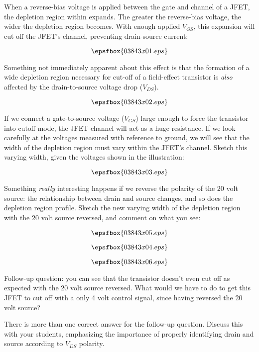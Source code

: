 

When a reverse-bias voltage is applied between the gate and channel of a JFET, the depletion region within expands.  The greater the reverse-bias voltage, the wider the depletion region becomes.  With enough applied $V_{GS}$, this expansion will cut off the JFET's channel, preventing drain-source current:

$$\epsfbox{03843x01.eps}$$

Something not immediately apparent about this effect is that the formation of a wide depletion region necessary for cut-off of a field-effect transistor is {\it also} affected by the drain-to-source voltage drop ($V_{DS}$).

$$\epsfbox{03843x02.eps}$$

If we connect a gate-to-source voltage ($V_{GS}$) large enough to force the transistor into cutoff mode, the JFET channel will act as a huge resistance.  If we look carefully at the voltages measured with reference to ground, we will see that the width of the depletion region must vary within the JFET's channel.  Sketch this varying width, given the voltages shown in the illustration:

$$\epsfbox{03843x03.eps}$$

Something {\it really} interesting happens if we reverse the polarity of the 20 volt source: the relationship between drain and source changes, and so does the depletion region profile.  Sketch the new varying width of the depletion region with the 20 volt source reversed, and comment on what you see:

$$\epsfbox{03843x05.eps}$$







$$\epsfbox{03843x04.eps}$$

$$\epsfbox{03843x06.eps}$$

\vskip 10pt

Follow-up question: you can see that the transistor doesn't even cut off as expected with the 20 volt source reversed.  What would we have to do to get this JFET to cut off with a only 4 volt control signal, since having reversed the 20 volt source?







There is more than one correct answer for the follow-up question.  Discuss this with your students, emphasizing the importance of properly identifying drain and source according to $V_{DS}$ polarity.




